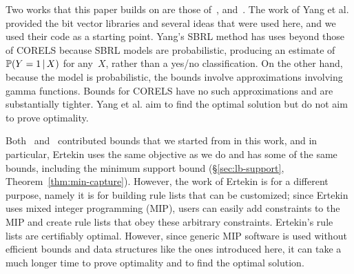 \begin{arxiv}
Two works that this paper builds on are those of~\citet{YangRuSe16}, and~\citet{RudinEr15}.
%
The work of Yang et al. provided the bit vector libraries and several ideas that were used here,
and we used their code as a starting point.
%
Yang's SBRL method has uses beyond those of CORELS because SBRL models are probabilistic,
producing an estimate of~${\mathbb{P}(Y=1 \,|\, X)}$ for any~$X$, rather than a yes/no classification.
%
On the other hand, because the model is probabilistic, the bounds involve approximations
involving gamma functions.
%
Bounds for CORELS have no such approximations and are substantially tighter.
%
Yang et al. aim to find the optimal solution but do not aim to prove optimality.

Both~\citet{YangRuSe16} and~\citet{RudinEr15} contributed bounds that we started from
in this work, and in particular, Ertekin uses the same objective as we do and has
some of the same bounds, including the minimum support bound (\S\ref{sec:lb-support}, Theorem~\ref{thm:min-capture}).
%
However, the work of Ertekin is for a different purpose, namely it is for building rule lists
that can be customized; since Ertekin uses mixed integer programming (MIP), users can easily
add constraints to the MIP and create rule lists that obey these arbitrary constraints.
%
Ertekin's rule lists are certifiably optimal.
%
However, since generic MIP software is used without efficient bounds and
data structures like the ones introduced here,
it can take a much longer time to prove optimality and to find the optimal solution.
\end{arxiv}






